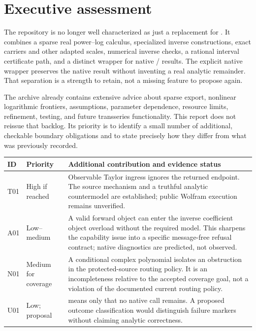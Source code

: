 \documentclass[11pt,letterpaper]{article}
\theoremstyle{definition}\newtheorem{definition}[proposition]{Definition}
\begin{document}
\section*{Executive assessment}
The repository is no longer well characterized as just a replacement for
. It combines a sparse real power--log calculus, specialized
inverse constructions, exact carriers and other adapted scales, numerical
inverse checks, a rational interval certificate path, and a distinct wrapper
for native / results. The explicit native wrapper
preserves the native result without inventing a real analytic remainder.
That separation is a strength to retain, not a missing feature to propose
again.\cite{core,operations,certificates,native,contracts}

The archive already contains extensive advice about sparse export, nonlinear
logarithmic frontiers, assumptions, parameter dependence, resource limits,
refinement, testing, and future transseries functionality. This report does not
reissue that backlog. Its priority is to identify a small number of additional,
checkable boundary obligations and to state precisely how they differ from
what was previously recorded.\cite{register,wave1,wave2}

\begin{tabularx}{\linewidth}{@{}P{0.43in}P{0.83in}Y@{}}
\toprule
ID & Priority & Additional contribution and evidence status\\
\midrule
T01 & High if reached & Observable Taylor ingress ignores the returned endpoint.
The source mechanism and a truthful analytic countermodel are established;
public Wolfram execution remains unverified.\\
A01 & Low--medium & A valid forward object can enter the inverse coefficient
object overload without the required model. This sharpens the capability issue
into a specific message-free refusal contract; native diagnostics are predicted,
not observed.\\
N01 & Medium for coverage & A conditional complex polynomial isolates an
obstruction in the protected-source routing policy. It is an incompleteness
relative to the accepted coverage goal, not a violation of the documented
current routing policy.\\
U01 & Low; proposal &  means only that
no native call remains. A proposed outcome classification would distinguish
failure markers without claiming analytic correctness.\\
\bottomrule
\end{tabularx}
\end{document}
